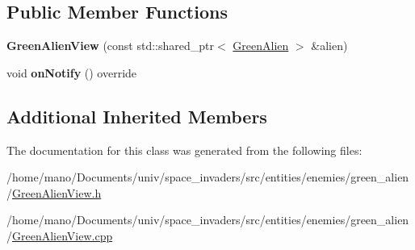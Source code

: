\subsection*{Public Member Functions}
\begin{DoxyCompactItemize}
\item 
\mbox{\label{classentities_1_1enemies_1_1green__alien_1_1GreenAlienView_a3db2841587821504e4073cef87cf7dc1}} 
{\bfseries Green\+Alien\+View} (const std\+::shared\+\_\+ptr$<$ \hyperlink{classentities_1_1enemies_1_1green__alien_1_1GreenAlien}{Green\+Alien} $>$ \&alien)
\item 
\mbox{\label{classentities_1_1enemies_1_1green__alien_1_1GreenAlienView_a18e2193d589d73e6449b14bfe2e2e99e}} 
void {\bfseries on\+Notify} () override
\end{DoxyCompactItemize}
\subsection*{Additional Inherited Members}


The documentation for this class was generated from the following files\+:\begin{DoxyCompactItemize}
\item 
/home/mano/\+Documents/univ/space\+\_\+invaders/src/entities/enemies/green\+\_\+alien/\hyperlink{GreenAlienView_8h}{Green\+Alien\+View.\+h}\item 
/home/mano/\+Documents/univ/space\+\_\+invaders/src/entities/enemies/green\+\_\+alien/\hyperlink{GreenAlienView_8cpp}{Green\+Alien\+View.\+cpp}\end{DoxyCompactItemize}

